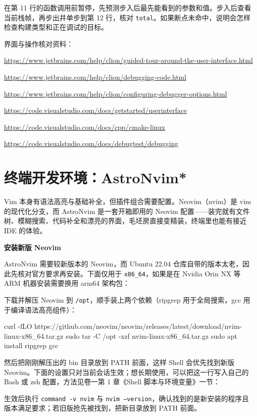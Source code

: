 \begin{exercise}\label{ex:ide-debug}
在第 11 行的函数调用前暂停，先预测步入后最先能看到的参数和值。步入后查看当前栈帧，再步出并单步到第 12 行，核对 \texttt{total}。如果断点未命中，说明会怎样检查构建类型和正在调试的目标。
\end{exercise}

\begin{note}
界面与操作核对资料：
\par\footnotesize
\url{https://www.jetbrains.com/help/clion/guided-tour-around-the-user-interface.html}\par
\url{https://www.jetbrains.com/help/clion/debugging-code.html}\par
\url{https://www.jetbrains.com/help/clion/configuring-debugger-options.html}\par
\url{https://code.visualstudio.com/docs/getstarted/userinterface}\par
\url{https://code.visualstudio.com/docs/cpp/cmake-linux}\par
\url{https://code.visualstudio.com/docs/debugtest/debugging}
\end{note}
\endgroup

\section{终端开发环境：AstroNvim*}
\label{sec:astronvim-customize}

Vim 本身有语法高亮与基础补全，但插件组合需要配置。Neovim（nvim）是 vim 的现代化分支，而 AstroNvim 是一套开箱即用的 Neovim 配置——装完就有文件树、模糊搜索、代码补全和漂亮的界面，毛坯房直接变精装，终端里也能有接近 IDE 的体验。

\textbf{安装新版 Neovim}

AstroNvim 需要较新版本的 Neovim，而 Ubuntu 22.04 仓库自带的版本太老，因此先核对官方要求再安装。下面仅用于 \texttt{x86\_64}，如果是在 Nvidia Orin NX 等 ARM 机器安装需要换用 arm64 架构包：

\begin{example}
下载并解压 Neovim 到 \texttt{/opt}，顺手装上两个依赖（ripgrep 用于全局搜索，gcc 用于编译语法高亮组件）：


\begin{tbash}
curl -fLO https://github.com/neovim/neovim/releases/latest/download/nvim-linux-x86_64.tar.gz
sudo tar -C /opt -xzf nvim-linux-x86_64.tar.gz
sudo apt install ripgrep gcc
\end{tbash}


然后把刚刚解压出的 bin 目录放到 PATH 前面，这样 Shell 会优先找到新版 Neovim。下面的设置只对当前会话生效；想长期使用，可以把这一行写入自己的 Bash 或 zsh 配置，方法见卷一第 1 章《Shell 脚本与环境变量》一节：




生效后执行 \texttt{command -v nvim} 与 \texttt{nvim --version}，确认找到的是新安装的程序且版本满足要求；若旧版抢先被找到，把新目录放到 PATH 前面。
\end{example}

